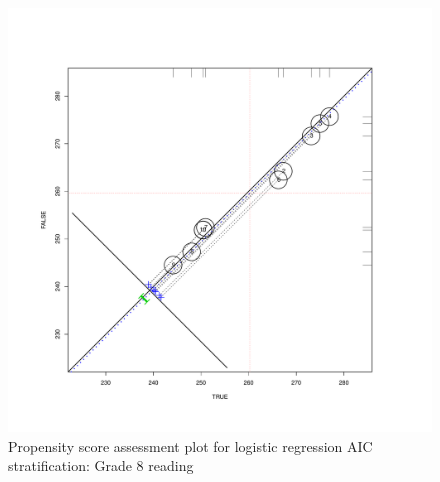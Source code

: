\clearpage
\begin{figure}
\begin{center}
\includegraphics[height=.4\textheight,width=.4\textheight]{../Figures2009/g8read-circpsa10-AIC.pdf}
\caption{Propensity score assessment plot for logistic regression AIC stratification: Grade 8 reading}
\end{center}
\end{figure}




